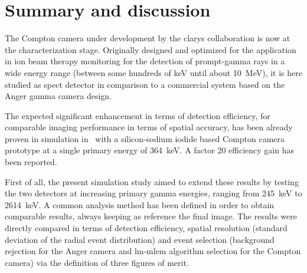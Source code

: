 \section{Summary and discussion}\label{chap5::sec::Conclusions}

The Compton camera under development by the \gls{clarys} collaboration is now at the characterization stage. Originally designed and optimized for the application in ion beam therapy monitoring  for the detection of prompt-gamma rays in a wide energy range (between some hundreds of keV until about 10~MeV), it is here studied as \gls{spect} detector in comparison to a commercial system based on the Anger gamma camera design.

The expected significant enhancement in terms of detection efficiency, for comparable imaging performance in terms of spatial accuracy, has been already proven in simulation in~\parencite{Han2008} with a silicon-sodium iodide based Compton camera prototype at a single primary energy of 364~keV. A factor 20 efficiency gain has been reported.

First of all, the present simulation study aimed to extend these results by testing the two detectors at increasing primary gamma energies, ranging from 245~keV to 2614~keV. A common analysis method has been defined in order to obtain comparable results, always keeping as reference the final image. The results were directly compared in terms of  detection efficiency, spatial resolution (standard deviation of the radial event distribution) and event selection (background rejection for the Anger camera and \gls{lm-mlem} algorithm selection for the Compton camera) via the definition of three figures of merit.

